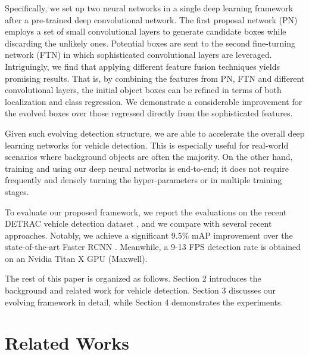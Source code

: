 \documentclass[5pt]{article}
\begin{document}
Specifically, we set up two neural networks in a single deep learning framework after a pre-trained deep convolutional network. The first proposal network (PN) employs a set of small convolutional layers to generate candidate boxes while discarding the unlikely ones. Potential boxes are sent to the second fine-turning network (FTN) in which sophisticated convolutional layers are leveraged. Intriguingly, we find that applying different feature fusion techniques yields promising results. That is, by combining the features from PN, FTN and different convolutional layers, the initial object boxes can be refined in terms of both localization and class regression. We demonstrate a considerable improvement for the evolved boxes over those regressed directly from the sophisticated features.

Given such evolving detection structure, we are able to accelerate the overall deep learning networks for vehicle detection. This is especially useful for real-world scenarios where background objects are often the majority. On the other hand, training and using our deep neural networks is end-to-end; it does not require frequently and densely turning the hyper-parameters or in multiple training stages.

To evaluate our proposed framework, we report the evaluations on the recent DETRAC vehicle detection dataset \cite{DETRAC:CoRR:WenDCLCQLYL15}, and we compare with several recent approaches. Notably, we achieve a significant 9.5\% mAP improvement over the state-of-the-art Faster RCNN \cite{renNIPS15fasterrcnn}. Meanwhile, a 9-13 FPS detection rate is obtained on an Nvidia Titan X GPU (Maxwell).

The rest of this paper is organized as follows. Section 2 introduces the background and related work for vehicle detection. Section 3 discusses our evolving framework in detail, while Section 4 demonstrates the experiments.


\section{Related Works}
\end{document}
